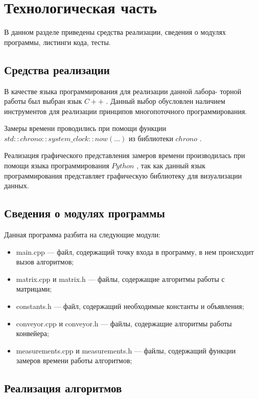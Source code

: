 \chapter{Технологическая часть}

В данном разделе приведены средства реализации, сведения о модулях программы, листинги кода, тесты.

\section{Средства реализации}

В качестве языка программирования для реализации данной лабора-
торной работы был выбран язык $C++$ \cite{c++}. Данный выбор обусловлен наличием инструментов для реализации принципов многопоточного программирования.

Замеры времени проводились при помощи функции $std::chrono::system\_clock::now(...)$ из библиотеки $chrono$ \cite{time}.

Реализация графического представления замеров времени производилась при помощи языка программирования $Python$ \cite{python}, так как данный язык программирования представляет графическую библиотеку для визуализации данных.

\section{Сведения о модулях программы}

Данная программа разбита на следующие модули:

\begin{itemize}
	\item main.cpp --- файл, содержащий точку входа в программу, в нем происходит вызов алгоритмов;
	\item matrix.cpp и matrix.h --- файлы, содержащие алгоритмы работы с матрицами;
	\item constants.h --- файл, содержащий необходимые константы и объявления;
	\item conveyor.cpp и conveyor.h --- файлы, содержащие алгоритмы работы конвейера;
	\item measurements.cpp и measurements.h --- файлы, содержащий функции замеров времени работы алгоритмов;
\end{itemize}

\section{Реализация алгоритмов}

